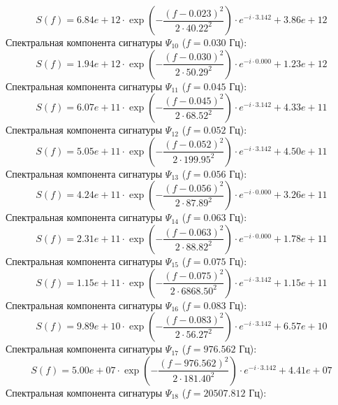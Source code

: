 \documentclass[11pt,twocolumn]{article}
\begin{document}
\begin{equation}
S(f) = 6.84e+12 \cdot \exp\left( -\frac{(f - 0.023)^2}{2 \cdot 40.22^2} \right) \cdot e^{-i \cdot 3.142} + 3.86e+12
\end{equation}
Спектральная компонента сигнатуры $\Psi_{10}$ ($f = 0.030$ Гц):
\begin{equation}
S(f) = 1.94e+12 \cdot \exp\left( -\frac{(f - 0.030)^2}{2 \cdot 50.29^2} \right) \cdot e^{-i \cdot 0.000} + 1.23e+12
\end{equation}
Спектральная компонента сигнатуры $\Psi_{11}$ ($f = 0.045$ Гц):
\begin{equation}
S(f) = 6.07e+11 \cdot \exp\left( -\frac{(f - 0.045)^2}{2 \cdot 68.52^2} \right) \cdot e^{-i \cdot 3.142} + 4.33e+11
\end{equation}
Спектральная компонента сигнатуры $\Psi_{12}$ ($f = 0.052$ Гц):
\begin{equation}
S(f) = 5.05e+11 \cdot \exp\left( -\frac{(f - 0.052)^2}{2 \cdot 199.95^2} \right) \cdot e^{-i \cdot 3.142} + 4.50e+11
\end{equation}
Спектральная компонента сигнатуры $\Psi_{13}$ ($f = 0.056$ Гц):
\begin{equation}
S(f) = 4.24e+11 \cdot \exp\left( -\frac{(f - 0.056)^2}{2 \cdot 87.89^2} \right) \cdot e^{-i \cdot 0.000} + 3.26e+11
\end{equation}
Спектральная компонента сигнатуры $\Psi_{14}$ ($f = 0.063$ Гц):
\begin{equation}
S(f) = 2.31e+11 \cdot \exp\left( -\frac{(f - 0.063)^2}{2 \cdot 88.82^2} \right) \cdot e^{-i \cdot 0.000} + 1.78e+11
\end{equation}
Спектральная компонента сигнатуры $\Psi_{15}$ ($f = 0.075$ Гц):
\begin{equation}
S(f) = 1.15e+11 \cdot \exp\left( -\frac{(f - 0.075)^2}{2 \cdot 6868.50^2} \right) \cdot e^{-i \cdot 3.142} + 1.15e+11
\end{equation}
Спектральная компонента сигнатуры $\Psi_{16}$ ($f = 0.083$ Гц):
\begin{equation}
S(f) = 9.89e+10 \cdot \exp\left( -\frac{(f - 0.083)^2}{2 \cdot 56.27^2} \right) \cdot e^{-i \cdot 3.142} + 6.57e+10
\end{equation}
Спектральная компонента сигнатуры $\Psi_{17}$ ($f = 976.562$ Гц):
\begin{equation}
S(f) = 5.00e+07 \cdot \exp\left( -\frac{(f - 976.562)^2}{2 \cdot 181.40^2} \right) \cdot e^{-i \cdot 3.142} + 4.41e+07
\end{equation}
Спектральная компонента сигнатуры $\Psi_{18}$ ($f = 20507.812$ Гц):
\end{document}
